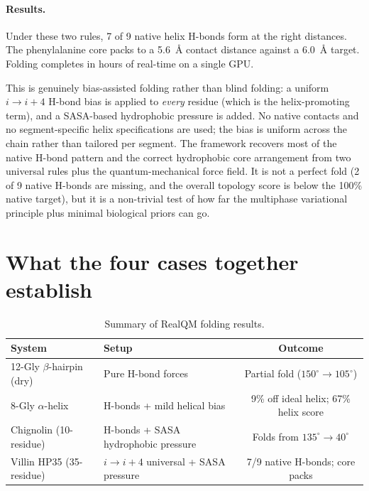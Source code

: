 \paragraph{Results.}
Under these two rules, 7 of 9 native helix H-bonds form at the right distances. The phenylalanine core packs to a 5.6~\AA{} contact distance against a 6.0~\AA{} target. Folding completes in hours of real-time on a single GPU.

This is genuinely bias-assisted folding rather than blind folding: a uniform $i \to i{+}4$ H-bond bias is applied to \emph{every} residue (which is the helix-promoting term), and a SASA-based hydrophobic pressure is added. No native contacts and no segment-specific helix specifications are used; the bias is uniform across the chain rather than tailored per segment. The framework recovers most of the native H-bond pattern and the correct hydrophobic core arrangement from two universal rules plus the quantum-mechanical force field. It is not a perfect fold (2 of 9 native H-bonds are missing, and the overall topology score is below the 100\% native target), but it is a non-trivial test of how far the multiphase variational principle plus minimal biological priors can go.

\section{What the four cases together establish}\label{sec:folding-summary}

\begin{table}[h]
\centering\small
\caption{Summary of RealQM folding results.}\label{tab:folding}
\begin{tabular}{l l c}
\toprule
System & Setup & Outcome \\
\midrule
12-Gly $\beta$-hairpin (dry)  & Pure H-bond forces                            & Partial fold ($150^\circ \to 105^\circ$) \\
8-Gly $\alpha$-helix          & H-bonds + mild helical bias                  & 9\% off ideal helix; 67\% helix score \\
Chignolin (10-residue)        & H-bonds + SASA hydrophobic pressure           & Folds from $135^\circ \to 40^\circ$ \\
Villin HP35 (35-residue)      & $i \to i{+}4$ universal + SASA pressure       & 7/9 native H-bonds; core packs \\
\bottomrule
\end{tabular}
\end{table}

